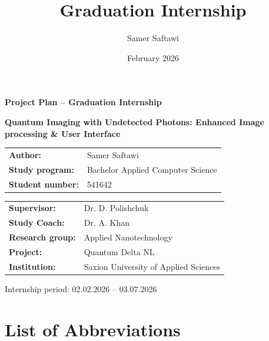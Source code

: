 \documentclass[12pt,a4paper]{article}
\title{Graduation Internship}
\author{Samer Saftawi}
\date{February 2026}
\begin{document}
\begin{titlepage}
\centering

\vspace*{1.5cm}

{\Large\bfseries Project Plan -- Graduation Internship\par}
\vspace{1.2cm}

{\Huge\bfseries Quantum Imaging with Undetected Photons: Enhanced Image processing \& User Interface\par}

\vspace{4cm}

{\large
\begin{tabular}{@{}l l@{}}
\textbf{Author:} & Samer Saftawi \\
\textbf{Study program:} & Bachelor Applied Computer Science \\
\textbf{Student number:} & 541642 \\
\end{tabular}
}

\vspace{1.5cm}

{\large
\begin{tabular}{@{}l l@{}}
\textbf{Supervisor:} & Dr. D. Polishchuk \\
\textbf{Study Coach:} & Dr. A. Khan \\
\textbf{Research group:} & Applied Nanotechnology \\
\textbf{Project:} & Quantum Delta NL \\
\textbf{Institution:} & Saxion University of Applied Sciences \\
\end{tabular}
}

\vfill

{\large
Internship period: 02.02.2026 -- 03.07.2026\\
}

\end{titlepage}

\newpage
\tableofcontents
\newpage

\listoffigures
\newpage

\section*{List of Abbreviations}
\begin{acronym}[]
\end{acronym}
\newpage
\end{document}
